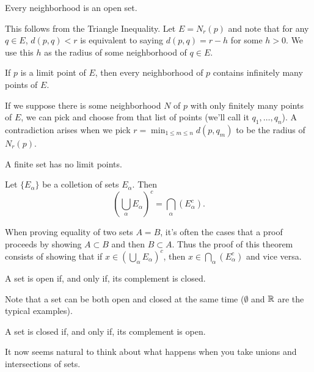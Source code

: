 \documentclass{article}
\begin{document}
\begin{theorem}
    Every neighborhood is an open set.
\end{theorem}
\begin{remark}
    This follows from the Triangle Inequality. Let $E=N_{r}(p)$ and note that for any $q\in E$, $d(p,q)<r$ is equivalent to saying $d(p,q)=r-h$ for some $h>0$. We use this $h$ as the radius of some neighborhood of $q\in E$.
\end{remark}    
\begin{theorem}
    If $p$ is a limit point of $E$, then every neighborhood of $p$ contains infinitely many points of $E$.
\end{theorem}
\begin{remark}
    If we suppose there is some neighborhood $N$ of $p$ with only finitely many points of $E$, we can pick and choose from that list of points (we'll call it $q_{1},\dotsc,q_{n}$). A contradiction arises when we pick $r=\min_{1\leq m\leq n}d(p,q_{m})$ to be the radius of $N_{r}(p)$.
\end{remark}
\begin{corollary}
    A finite set has no limit points.
\end{corollary}
\begin{theorem}[DeMorgan]
    Let $\{E_{\alpha}\}$ be a colletion of sets $E_{\alpha}$. Then 
    \[\left(\bigcup_{\alpha}E_{\alpha}\right)^{c}=\bigcap_{\alpha}(E_{\alpha}^{c}).\]
\end{theorem}
\begin{remark}
    When proving equality of two sets $A=B$, it's often the cases that a proof proceeds by showing $A\subset B$ and then $B\subset A$. Thus the proof of this theorem consists of showing that if $x\in \left(\bigcup_{\alpha}E_{\alpha}\right)^{c}$, then $x\in \bigcap_{\alpha}(E_{\alpha}^{c})$ and vice versa.
\end{remark}
\begin{theorem}
    A set is open if, and only if, its complement is closed.
\end{theorem}
\begin{remark}
    Note that a set can be both open and closed at the same time ($\emptyset$ and $\mathbb R$ are the typical examples).
\end{remark}
\begin{corollary}
    A set is closed if, and only if, its complement is open.
\end{corollary}
It now seems natural to think about what happens when you take unions and intersections of sets.
\end{document}

